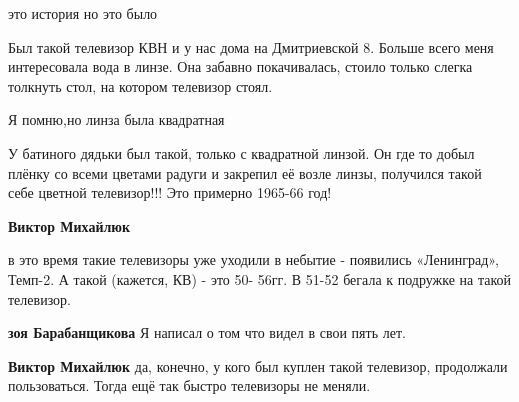 \begin{itemize}
это история но это было


Был такой телевизор КВН и у нас дома на Дмитриевской 8. Больше всего меня
интересовала вода в линзе. Она забавно покачивалась, стоило только слегка
толкнуть стол, на котором телевизор стоял.

Я помню,но линза была квадратная


У батиного дядьки был такой, только с квадратной линзой. Он где то добыл плёнку
со всеми цветами радуги и закрепил её возле линзы, получился такой себе цветной
телевизор!!! Это примерно 1965-66 год!

\begin{itemize} %
\textbf{Виктор Михайлюк} 

в это время такие телевизоры уже уходили в небытие - появились «Ленинград»,
Темп-2. А такой (кажется, КВ) - это 50- 56гг. В 51-52 бегала к подружке на
такой телевизор.

\begin{itemize} %
\textbf{зоя Барабанщикова} Я написал о том что видел в свои пять лет.

\textbf{Виктор Михайлюк} да, конечно, у кого был куплен такой телевизор, продолжали пользоваться. Тогда ещё так быстро телевизоры не меняли.
\end{itemize} %

\end{itemize} %


\end{itemize} %
